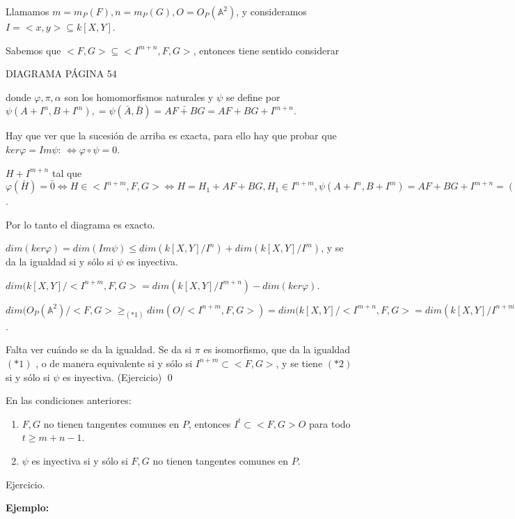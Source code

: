 \begin{Dem}
Llamamos $m=m_P(F),n=m_P(G), O=O_P(\mathbb{A}^2)$, y consideramos $I=<x,y> \subseteq k[X,Y]$. 

Sabemos que $<F,G>\subseteq <I^{m+n},F,G>$, entonces tiene sentido considerar

DIAGRAMA PÁGINA 54

donde $\varphi, \pi, \alpha$ son los homomorfismos naturales y $ \psi$ se define por $\psi(A+I^n,B+I^m),=\psi(\bar{A},\bar{B})=\bar{AF+BG}=AF+BG+I^{m+n}$.

Hay que ver que la sucesión de arriba es exacta, para ello hay que probar que $ker \varphi =Im \psi$:
\framebox{$\supseteq $ } $\Leftrightarrow \varphi \circ \psi = 0$.

\framebox{$\subseteq$ } $H+I^{m+n}$ tal que $\varphi(\bar{H})=\bar{0} \Leftrightarrow H\in <I^{n+m},F,G> \Leftrightarrow H=H_1+AF+BG, H_1\in I^{n+m}, \psi(A+I^n,B+I^m)=AF+BG+I^{m+n}=(AF+BG+H_1)+I^{n+m}$.

Por lo tanto el diagrama es exacto. 

$dim (ker \varphi) =dim(Im \psi) \le dim (k[X,Y]/I^n)+ dim(k[X,Y]/I^m)$, y se da la igualdad si y sólo si $\psi$ es inyectiva. 

$dim(k[X,Y]/<I^{n+m},F,G>=dim (k[X,Y]/I^{m+n})-dim(ker \varphi)$.

$dim(O_P(\mathbb{A}^2)/<F,G> \ge_{(*1)} dim (O/<I^{n+m},F,G>)=dim (k[X,Y]/<I^{m+n},F,G> = dim(k[X,Y]/I^{n+m})-dim(ker \varphi) \ge_{(*2)} dim (k[X,Y]/I^{n+m})-dim(k[X,Y]/I^n)-dim(k[X,Y]/I^m)=m\cdot n$. 

Falta ver cuándo se da la igualdad. Se da si $\pi $ es isomorfismo, que da la igualdad $(*1)$ , o de manera equivalente si y sólo si $I^{n+m} \subset <F,G>$, y se tiene $(*2)$ si y sólo si $\psi$ es inyectiva. (Ejercicio) \qed
\end{Dem}

\begin{Lem}
En las condiciones anteriores:
\begin{enumerate}
\item $F,G$ no tienen tangentes comunes en $P$, entonces $I^t\subset <F,G>O$ para todo $t\ge m+n-1$. 
\item $\psi$ es inyectiva si y sólo si $F,G$ no tienen tangentes comunes en $P$.
\end{enumerate}
\end{Lem}

\begin{Dem}
Ejercicio. 
\end{Dem}

\textbf{Ejemplo:}

